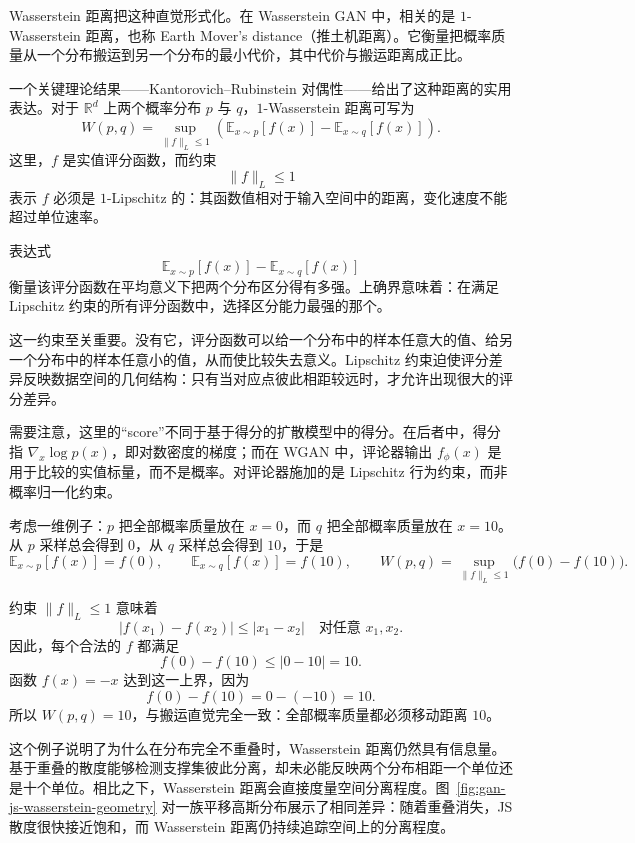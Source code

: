 Wasserstein 距离把这种直觉形式化。在 Wasserstein GAN 中，相关的是 $1$-Wasserstein 距离，也称 Earth Mover's distance（推土机距离）。它衡量把概率质量从一个分布搬运到另一个分布的最小代价，其中代价与搬运距离成正比。

一个关键理论结果——Kantorovich--Rubinstein 对偶性——给出了这种距离的实用表达。对于 $\mathbb{R}^d$ 上两个概率分布 $p$ 与 $q$，$1$-Wasserstein 距离可写为
\[
\boxed{
W(p,q)
=
\sup_{\|f\|_{L} \le 1}
\left(
\mathbb{E}_{x \sim p}[f(x)]
-
\mathbb{E}_{x \sim q}[f(x)]
\right).
}
\]
这里，$f$ 是实值评分函数，而约束
\[
\|f\|_{L}\leq 1
\]
表示 $f$ 必须是 $1$-Lipschitz 的：其函数值相对于输入空间中的距离，变化速度不能超过单位速率。

表达式
\[
\mathbb{E}_{x \sim p}[f(x)]
-
\mathbb{E}_{x \sim q}[f(x)]
\]
衡量该评分函数在平均意义下把两个分布区分得有多强。上确界意味着：在满足 Lipschitz 约束的所有评分函数中，选择区分能力最强的那个。

这一约束至关重要。没有它，评分函数可以给一个分布中的样本任意大的值、给另一个分布中的样本任意小的值，从而使比较失去意义。Lipschitz 约束迫使评分差异反映数据空间的几何结构：只有当对应点彼此相距较远时，才允许出现很大的评分差异。

需要注意，这里的“score”不同于基于得分的扩散模型中的得分。在后者中，得分指 $\nabla_x\log p(x)$，即对数密度的梯度；而在 WGAN 中，评论器输出 $f_\phi(x)$ 是用于比较的实值标量，而不是概率。对评论器施加的是 Lipschitz 行为约束，而非概率归一化约束。

\begin{tcolorbox}[
  colback=blue!4,
  colframe=blue!50!black,
  title={Wasserstein 距离的一个计算示例},
  boxrule=0.6pt,
  arc=2mm,
  left=2mm,
  right=2mm,
  top=1mm,
  bottom=1mm
]
考虑一维例子：$p$ 把全部概率质量放在 $x=0$，而 $q$ 把全部概率质量放在 $x=10$。从 $p$ 采样总会得到 $0$，从 $q$ 采样总会得到 $10$，于是
\[
\mathbb{E}_{x\sim p}[f(x)] = f(0),
\qquad
\mathbb{E}_{x\sim q}[f(x)] = f(10),
\qquad
W(p,q)
=
\sup_{\|f\|_L\leq 1}
\big(f(0)-f(10)\big).
\]

约束 $\|f\|_L\leq 1$ 意味着
\[
|f(x_1)-f(x_2)|\leq |x_1-x_2|
\quad
\text{对任意 }x_1,x_2.
\]
因此，每个合法的 $f$ 都满足
\[
f(0)-f(10)\leq |0-10|=10.
\]
函数 $f(x)=-x$ 达到这一上界，因为
\[
f(0)-f(10)=0-(-10)=10.
\]
所以 $W(p,q)=10$，与搬运直觉完全一致：全部概率质量都必须移动距离 $10$。
\end{tcolorbox}

这个例子说明了为什么在分布完全不重叠时，Wasserstein 距离仍然具有信息量。基于重叠的散度能够检测支撑集彼此分离，却未必能反映两个分布相距一个单位还是十个单位。相比之下，Wasserstein 距离会直接度量空间分离程度。图~\ref{fig:gan-js-wasserstein-geometry} 对一族平移高斯分布展示了相同差异：随着重叠消失，JS 散度很快接近饱和，而 Wasserstein 距离仍持续追踪空间上的分离程度。

